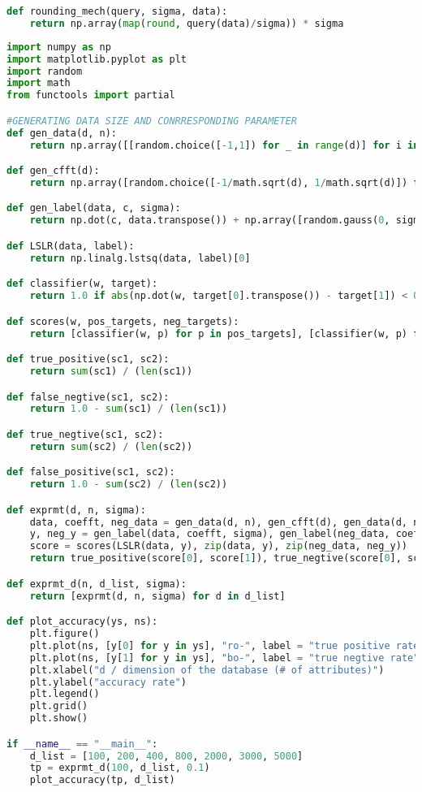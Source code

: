 \begin{lstlisting}[label = code-p2-2b, language=Python, caption=Python Code for Problem 2 - 2 - (b)]
def rounding_mech(query, sigma, data):
	return np.array(map(round, query(data)/sigma)) * sigma
\end{lstlisting}


\begin{lstlisting}[label = code-p2-3, language=Python, caption=Python Code for Problem 2 - 3]
import numpy as np
import matplotlib.pyplot as plt
import random
import math
from functools import partial

#GENERATING DATA SIZE AND CONRRESPONDING PARAMETER
def gen_data(d, n):
	return np.array([[random.choice([-1,1]) for _ in range(d)] for i in range(n)])

def gen_cfft(d):
	return np.array([random.choice([-1/math.sqrt(d), 1/math.sqrt(d)]) for _ in range(d)])

def gen_label(data, c, sigma):
	return np.dot(c, data.transpose()) + np.array([random.gauss(0, sigma) for _ in data]) 

def LSLR(data, label):
	return np.linalg.lstsq(data, label)[0]

def classifier(w, target):
	return 1.0 if abs(np.dot(w, target[0].transpose()) - target[1]) < 0.01 else 0.0

def scores(w, pos_targets, neg_targets):
	return [classifier(w, p) for p in pos_targets], [classifier(w, p) for p in neg_targets]

def true_positive(sc1, sc2):
	return sum(sc1) / (len(sc1))

def false_negtive(sc1, sc2):
	return 1.0 - sum(sc1) / (len(sc1))

def true_negtive(sc1, sc2):
	return sum(sc2) / (len(sc2))

def false_positive(sc1, sc2):
	return 1.0 - sum(sc2) / (len(sc2))

def exprmt(d, n, sigma):
	data, coefft, neg_data = gen_data(d, n), gen_cfft(d), gen_data(d, n)
	y, neg_y = gen_label(data, coefft, sigma), gen_label(neg_data, coefft, sigma)
	score = scores(LSLR(data, y), zip(data, y), zip(neg_data, neg_y))
	return true_positive(score[0], score[1]), true_negtive(score[0], score[1])

def exprmt_d(n, d_list, sigma):
	return [exprmt(d, n, sigma) for d in d_list]

def plot_accuracy(ys, ns):
	plt.figure()
	plt.plot(ns, [y[0] for y in ys], "ro-", label = "true positive rate")
	plt.plot(ns, [y[1] for y in ys], "bo-", label = "true negtive rate")
	plt.xlabel("d / dimension of the database (# of attributes)")
	plt.ylabel("accuracy rate")
	plt.legend()
	plt.grid()
	plt.show()

if __name__ == "__main__":
	d_list = [100, 200, 400, 800, 2000, 3000, 5000]
	tp = exprmt_d(100, d_list, 0.1)
	plot_accuracy(tp, d_list)
\end{lstlisting}

